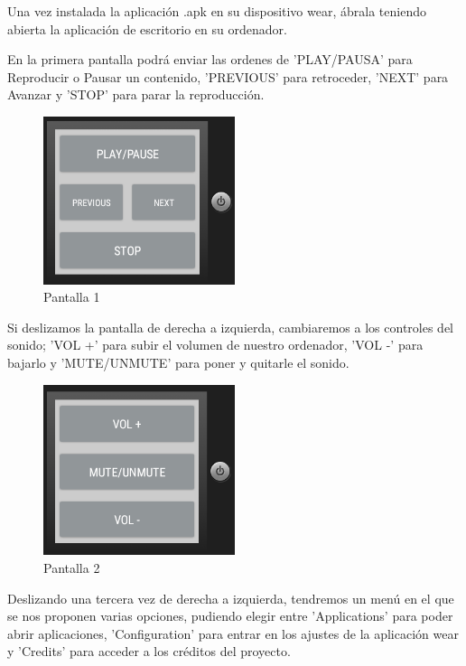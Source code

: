 \documentclass{documentation}
\begin{document}
Una vez instalada la aplicación .apk en su dispositivo wear, ábrala teniendo abierta la aplicación de escritorio en su ordenador.

En la primera pantalla podrá enviar las ordenes de 'PLAY/PAUSA' para Reproducir o Pausar un contenido, 'PREVIOUS' para retroceder, 'NEXT' para Avanzar y 'STOP' para parar la reproducción.

\begin{figure}[!ht]
	\centering
	\includegraphics[width=0.5\textwidth]{figures/sw/1.png}
	\caption{Pantalla 1}
\end{figure}

Si deslizamos la pantalla de derecha a izquierda, cambiaremos a los controles del sonido; 'VOL +' para subir el volumen de nuestro ordenador, 'VOL -' para bajarlo y 'MUTE/UNMUTE' para poner y quitarle el sonido.

\begin{figure}[!ht]
	\centering
	\includegraphics[width=0.5\textwidth]{figures/sw/2.png}
	\caption{Pantalla 2}
\end{figure}

Deslizando una tercera vez de derecha a izquierda, tendremos un menú en el que se nos proponen varias opciones, pudiendo elegir entre 'Applications' para poder abrir aplicaciones, 'Configuration' para entrar en los ajustes de la aplicación wear y 'Credits' para acceder a los créditos del proyecto.
\end{document}
